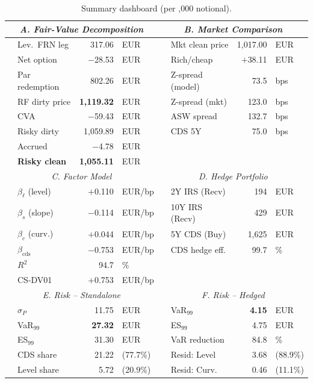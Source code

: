 \documentclass[11pt,a4paper]{article}
\begin{document}
\begin{table}[htbp]
  \centering\footnotesize
  \setlength{\tabcolsep}{3pt}
  \caption{Summary dashboard (per ,000 notional).}
  \label{tab:q22_fv}
  \begin{tabular}{@{}llrl|llrl@{}}
    \toprule
    \multicolumn{4}{c|}{\textit{A. Fair-Value Decomposition}} &
    \multicolumn{4}{c}{\textit{B. Market Comparison}} \\
    \midrule
    & Lev.\ FRN leg & 317.06 & EUR &
    & Mkt clean price & 1,017.00 & EUR \\
    & Net option & $-$28.53 & EUR &
    & Rich/cheap & $+$38.11 & EUR \\
    & Par redemption & 802.26 & EUR &
    & Z-spread (model) & 73.5 & bps \\
    & RF dirty price & \textbf{1,119.32} & EUR &
    & Z-spread (mkt) & 123.0 & bps \\
    & CVA & $-$59.43 & EUR &
    & ASW spread & 132.7 & bps \\
    & Risky dirty & 1,059.89 & EUR &
    & CDS 5Y & 75.0 & bps \\
    & Accrued & $-$4.78 & EUR & & & & \\
    & \textbf{Risky clean} & \textbf{1,055.11} & EUR & & & & \\
    \midrule
    \multicolumn{4}{c|}{\textit{C. Factor Model}} &
    \multicolumn{4}{c}{\textit{D. Hedge Portfolio}} \\
    \midrule
    & $\beta_\ell$ (level) & $+$0.110 & EUR/bp &
    & 2Y IRS (Recv) & 194 & EUR \\
    & $\beta_s$ (slope) & $-$0.114 & EUR/bp &
    & 10Y IRS (Recv) & 429 & EUR \\
    & $\beta_c$ (curv.) & $+$0.044 & EUR/bp &
    & 5Y CDS (Buy) & 1,625 & EUR \\
    & $\beta_{\mathrm{cds}}$ & $-$0.753 & EUR/bp &
    & CDS hedge eff. & 99.7 & \% \\
    & $R^2$ & 94.7 & \% &
    & & & \\
    & CS-DV01 & $+$0.753 & EUR/bp &
    & & & \\
    \midrule
    \multicolumn{4}{c|}{\textit{E. Risk -- Standalone}} &
    \multicolumn{4}{c}{\textit{F. Risk -- Hedged}} \\
    \midrule
    & $\sigma_P$ & 11.75 & EUR &
    & VaR$_{99}$ & \textbf{4.15} & EUR \\
    & VaR$_{99}$ & \textbf{27.32} & EUR &
    & ES$_{99}$ & 4.75 & EUR \\
    & ES$_{99}$ & 31.30 & EUR &
    & VaR reduction & 84.8 & \% \\
    & \;CDS share & 21.22 & (77.7\%) &
    & \;Resid: Level & 3.68 & (88.9\%) \\
    & \;Level share & 5.72 & (20.9\%) &
    & \;Resid: Curv. & 0.46 & (11.1\%) \\
    \bottomrule
  \end{tabular}
\end{table}
\end{document}
